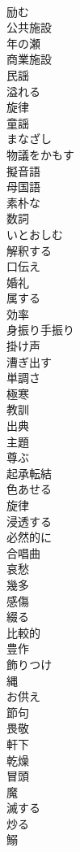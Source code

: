\documentclass[8pt]{extreport}
\begin{document}
\begin{CJK}{UTF8}{min}
\\	励む
\\	公共施設
\\	年の瀬
\\	商業施設
\\	民謡
\\	溢れる
\\	旋律
\\	童謡
\\	まなざし
\\	物議をかもす
\\	擬音語
\\	母国語
\\	素朴な
\\	数詞
\\	いとおしむ
\\	解釈する
\\	口伝え
\\	婚礼
\\	属する
\\	効率
\\	身振り手振り
\\	掛け声
\\	漕ぎ出す
\\	単調さ
\\	極寒
\\	教訓
\\	出典
\\	主題
\\	尊ぶ
\\	起承転結
\\	色あせる
\\	旋律
\\	浸透する
\\	必然的に
\\	合唱曲
\\	哀愁
\\	幾多
\\	感傷
\\	綴る
\\	比較的
\\	豊作
\\	飾りつけ
\\	縄
\\	お供え
\\	節句
\\	畏敬
\\	軒下
\\	乾燥
\\	冒頭
\\	魔
\\	滅する
\\	炒る
\\	鰯

\end{CJK}
\end{document}

